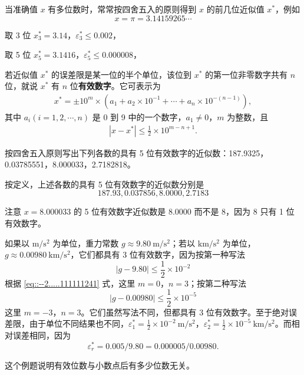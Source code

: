 \documentclass[../../main.tex]{subfiles}
\begin{document}
\begin{example}
当准确值 $x$ 有多位数时，常常按四舍五入的原则得到 $x$ 的前几位近似值 $x^*$，例如 
\[
x = \pi = 3.14159265\cdots
\]

取 3 位  $x_3^* = 3.14$，$\varepsilon_3^* \leqslant 0.002$，

取 5 位  $x_5^* = 3.1416$，$\varepsilon_5^* \leqslant 0.000008$，
\end{example}

\begin{definition}[有效数字]
若近似值 $x^*$ 的误差限是某一位的半个单位，该位到 $x^*$ 的第一位非零数字共有 $n$ 位，就说 $x^*$ 有 $n$ 位\textbf{有效数字}。它可表示为 
\begin{align}
x^* = \pm 10^m \times (a_1 + a_2 \times 10^{-1} + \cdots + a_n \times 10^{-(n - 1)}),\label{eq::--2.....111111241}
\end{align}
其中 $a_i (i = 1, 2, \cdots, n)$ 是 0 到 9 中的一个数字，$a_1 \neq 0$，$m$ 为整数，且 
\begin{align}
| x - x^* | \leqslant \frac{1}{2} \times 10^{m - n + 1}.\label{eq::--2.....111111242}
\end{align}
\end{definition}

\begin{example}
按四舍五入原则写出下列各数的具有 5 位有效数字的近似数：187.9325，0.03785551，8.000033，2.7182818。
\end{example}
\begin{solution}
按定义，上述各数的具有 5 位有效数字的近似数分别是 
\[
187.93, 0.037856, 8.0000, 2.7183
\]

注意 $x = 8.000033$ 的 5 位有效数字近似数是 8.0000 而不是 8，因为 8 只有 1 位有效数字。
\end{solution}

\begin{example}
如果以 $\mathrm{m/s^2}$ 为单位，重力常数 $g \approx 9.80\ \mathrm{m/s^2}$；若以 $\mathrm{km/s^2}$ 为单位，$g \approx 0.00980\ \mathrm{km/s^2}$，它们都具有 3 位有效数字，因为按第一种写法 
\[
| g - 9.80 | \leqslant \frac{1}{2} \times 10^{-2}
\]
根据 \eqref{eq::--2.....111111241} 式，这里 $m = 0$，$n = 3$；按第二种写法 
\[
| g - 0.00980 | \leqslant \frac{1}{2} \times 10^{-5}
\]
这里 $m = -3$，$n = 3$。它们虽然写法不同，但都具有 3 位有效数字。至于绝对误差限，由于单位不同结果也不同，$\varepsilon_1^* = \frac{1}{2} \times 10^{-2}\ \mathrm{m/s^2}$，$\varepsilon_2^* = \frac{1}{2} \times 10^{-5}\ \mathrm{km/s^2}$。而相对误差相同，因为 
\[
\varepsilon_r^* = 0.005 / 9.80 = 0.000005 / 0.00980.
\]
\end{example}
\begin{note}
这个例题说明有效位数与小数点后有多少位数无关。
\end{note}
\end{document}
